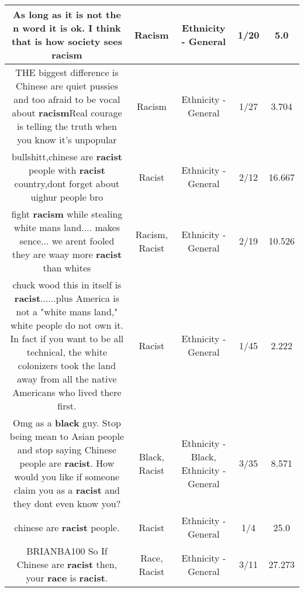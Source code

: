 \documentclass[11pt]{article}
\newlength\mylength
\begin{document}
\begin{center}
\begin{longtable}{|C{.65\mylength}|C{.30\mylength}|C{.12\mylength}|C{.12\mylength}|C{.12\mylength}|}
  \small As long as it is not the n word it is ok. I think that is how society sees racism\normalsize   & Racism & Ethnicity - General & 1/20 & 5.0 \\  \hline
  \small THE biggest difference is Chinese are quiet pussies and too afraid to be vocal about \textbf{racism}Real courage is telling the truth when you know it's unpopular\normalsize   & Racism & Ethnicity - General & 1/27 & 3.704 \\  \hline
  \small bullshitt,chinese are \textbf{racist} people with \textbf{racist} country,dont forget about uighur people bro\normalsize   & Racist & Ethnicity - General & 2/12 & 16.667 \\  \hline
  \small fight \textbf{racism} while stealing white mans land.... makes sence... we arent fooled they are waay more \textbf{racist} than whites\normalsize   & Racism, Racist & Ethnicity - General & 2/19 & 10.526 \\  \hline
  \small chuck wood this in itself is \textbf{racist}......plus America is not a "white mans land," white people do not own it. In fact if you want to be all technical, the white colonizers took the land away from all the native Americans who lived there first.\normalsize   & Racist & Ethnicity - General & 1/45 & 2.222 \\  \hline
  \small Omg as a \textbf{black} guy. Stop being mean to Asian people and  stop saying Chinese people are \textbf{racist}. How would you like if someone claim you as a \textbf{racist} and they  dont even know you?\normalsize   & Black, Racist & Ethnicity - Black, Ethnicity - General & 3/35 & 8.571 \\  \hline
  \small chinese are \textbf{racist} people.\normalsize   & Racist & Ethnicity - General & 1/4 & 25.0 \\  \hline
  \small BRIANBA100 So If Chinese are \textbf{racist} then, your \textbf{race} is \textbf{racist}.\normalsize   & Race, Racist & Ethnicity - General & 3/11 & 27.273 \\  \hline

\end{longtable}
\end{center}
\end{document}
